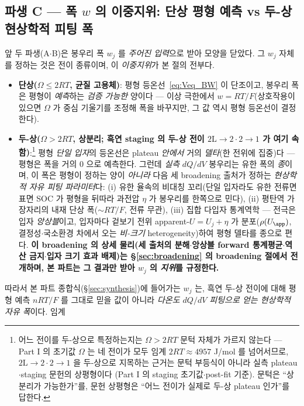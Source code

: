 \subsection{파생 C --- 폭 $w$ 의 이중지위: 단상 평형 예측 vs 두-상 현상학적 피팅 폭}\label{ssec:weff}
앞 두 파생(A$\cdot$B)은 봉우리 폭 $w_j$ 를 \emph{주어진 입력}으로 받아 모양을 닫았다. 그 $w_j$ 자체를 정하는
것은 전이 종류이며, 이 \emph{이중지위}가 본 절의 전부다.
\begin{itemize}[leftmargin=1.4em,itemsep=2pt]
\item \textbf{단상($\Omega\le2RT$, 균질 고용체)}: 평형 등온선~\eqref{eq:Veq_BW} 이 단조이고, 봉우리 폭은 평형이
\emph{예측}하는 \emph{검증 가능한} 양이다 --- 이상 극한에서 $w=RT/F$(상호작용이 있으면 $\Omega$ 가 중심
기울기를 조정해 폭을 바꾸지만, 그 값 역시 평형 등온선이 결정한다).
\item \textbf{두-상($\Omega>2RT$, 상분리; 흑연 staging 의 두-상 전이 $2\mathrm L\!\to\!2\cdot2\!\to\!1$ 가 여기
속함)}:\footnote{어느 전이를 두-상으로 특정하는지는 $\Omega>2RT$ 문턱 자체가 가르지 않는다 --- Part I 의
초기값 $\Omega$ 는 네 전이가 모두 임계 $2RT\approx4957$ J/mol 를 넘어서므로, $2\mathrm L\!\to\!2\cdot2\!\to\!1$
을 두-상으로 지목하는 근거는 문턱 부등식이 아니라 실측 plateau$\cdot$staging 문헌의 상평형이다
\cite{dahn1991,ohzuku1993}(Part I 의 staging 초기값$\cdot$post-fit 기준). 문턱은 ``상분리가 가능한가''를, 문헌 상평형은 ``어느 전이가 실제로 두-상
plateau 인가''를 답한다.} 평형 \emph{단일 입자}의 등온선은 plateau \emph{안에서} 거의 \emph{델타}(한 전위에 집중)다 --- 평형은
폭을 거의 $0$ 으로 예측한다. 그런데 \emph{실측} $dQ/dV$ 봉우리는 유한 폭의 \emph{종}이며, 이 폭은 평형이 정하는
양이 \emph{아니라} 다음 세 broadening 출처가 정하는 \emph{현상학적 자유 피팅 파라미터}다: (i) 유한 율속의
비대칭 꼬리(단일 입자라도 유한 전류면 표면 SOC 가 평형을 뒤따라 과전압 $\eta$ 가 봉우리를 한쪽으로 민다),
(ii) 평탄역 가장자리의 내재 단상 폭($\sim RT/F$, 전류 무관), (iii) 집합 다입자 통계역학 --- 전극은 입자
\emph{앙상블}이고, 입자마다 겉보기 전위 apparent-$U=U_j+\eta$ 가 분포($\rho(U_\app)$, 결정성$\cdot$국소환경
차에서 오는 \emph{비-크기} heterogeneity)하여 평형 델타를 종으로 편다. \textbf{이 broadening 의 상세 물리(세
출처의 분해$\cdot$앙상블 forward 통계평균$\cdot$역산 금지$\cdot$입자 크기 효과 배제)는 \S\ref{sec:broadening} 의
broadening 절에서 전개하며, 본 파트는 그 결과만 받아 $w_j$ 의 \emph{지위}를 규정한다.}
\end{itemize}
따라서 본 파트 종합식(\S\ref{sec:synthesis})에 들어가는 $w_j$ 는, 흑연 두-상 전이에 대해 평형 예측
$nRT/F$ 를 그대로 믿을 값이 아니라 \emph{다온도 $dQ/dV$ 피팅으로 얻는 현상학적 자유 폭}이다. 임계
